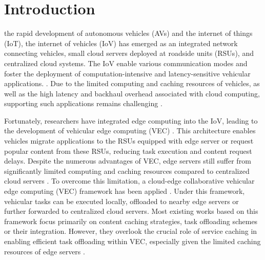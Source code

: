 \documentclass[lettersize,journal]{IEEEtran}
\begin{document}
\section{Introduction}
the rapid development of autonomous vehicles (AVs) and the internet of things (IoT), the internet of vehicles (IoV) has emerged as an integrated network connecting vehicles, small cloud servers deployed at roadside units (RSUs), and centralized cloud systems. The IoV enable various communication modes and foster the deployment of computation-intensive and latency-sensitive vehicular applications. \cite{Xing-1, TalebkhahSali-2}.
Due to the limited computing and caching resources of vehicles, as well as the high latency and backhaul overhead associated with cloud computing, supporting such applications remains challenging \cite{WaheedShah-3}.

Fortunately, researchers have integrated edge computing into the IoV, leading to the development  of vehicular edge computing (VEC) \cite{LiuChen-5, WuWang-6, M.S.-7}. 
This architecture enables vehicles migrate applications to the RSUs equipped with edge server  or request popular content from these RSUs, reducing task execution and content request delays.
% 
Despite the numerous advantages of VEC, edge servers still suffer from significantly limited computing and caching resources compared to centralized cloud servers \cite{Reiss-MirzaeiGhobaei-Arani-13, KhanMustafa-14}. 
To overcome this limitation, a cloud-edge collaborative vehicular edge computing (VEC) framework has been applied \cite{YanLi-17, RenChen-19}.
Under this framework, vehicular tasks can be executed locally, offloaded to nearby edge servers or further forwarded to centralized cloud servers.
Most existing works based on this framework focus primarily on content caching strategies, task offloading schemes or their integration. However, they  overlook the crucial role of service caching in enabling efficient task offloading within VEC, especially given the limited caching resources of edge servers \cite{MaoYou-12}.
\end{document}
